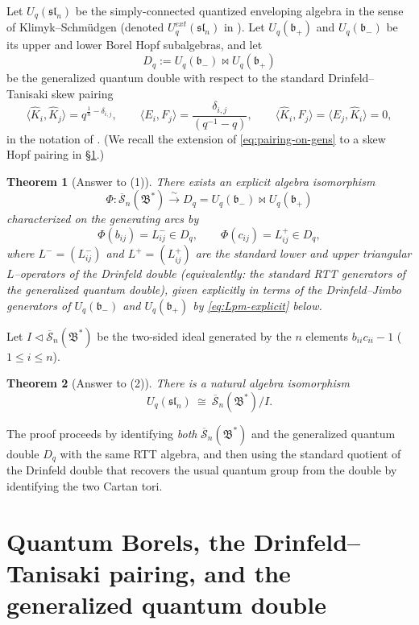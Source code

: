 \documentclass[11pt]{article}
\newcommand{\Uc}{U}
\newcommand{\sl}{\mathfrak{sl}}
\newcommand{\fb}{\mathfrak{b}}
\newcommand{\fB}{\mathfrak{B}}
\newcommand{\bcS}{\overline{\mathcal S}}
\newcommand{\la}{\langle}
\newcommand{\ra}{\rangle}
\newcommand{\bipr}{\bowtie}
\theoremstyle{plain}
\newtheorem{theorem}{Theorem}[section]
\theoremstyle{definition}
\begin{document}
Let $\Uc_q(\sl_n)$ be the simply-connected quantized enveloping algebra in the sense of Klimyk--Schm\"udgen (denoted $U_q^{ext}(\sl_n)$ in \cite[Ch.~8]{KS}).
Let $\Uc_q(\fb_+)$ and $\Uc_q(\fb_-)$ be its upper and lower Borel Hopf subalgebras, and let
\[
D_q := \Uc_q(\fb_-)\bipr \Uc_q(\fb_+)
\]
be the generalized quantum double with respect to the standard Drinfeld--Tanisaki skew pairing
\begin{equation}\label{eq:pairing-on-gens}
\la \hat K_i, \hat K_j\ra =q^{\frac1n-\delta_{i,j}},\qquad
\la E_i,F_j\ra=\frac{\delta_{i,j}}{(q^{-1}-q)}, \qquad
\la \hat K_i,F_j\ra=\la E_j,\hat K_i\ra=0,
\end{equation}
in the notation of \cite{KS}. (We recall the extension of \eqref{eq:pairing-on-gens} to a skew Hopf pairing in \S\ref{sec:pairing-double}.)

\begin{theorem}[Answer to (1)]\label{thm:main1}
There exists an explicit algebra isomorphism
\[
\Phi:\bcS_n(\fB^*)\xrightarrow{\ \sim\ } D_q=\Uc_q(\fb_-)\bipr \Uc_q(\fb_+)
\]
characterized on the generating arcs by
\[
\Phi(b_{ij})=L^-_{ij}\in D_q,\qquad \Phi(c_{ij})=L^+_{ij}\in D_q,
\]
where $L^-=(L^-_{ij})$ and $L^+=(L^+_{ij})$ are the standard lower and upper triangular $L$--operators of the Drinfeld double (equivalently: the standard RTT generators of the generalized quantum double), given explicitly in terms of the Drinfeld--Jimbo generators of $\Uc_q(\fb_-)$ and $\Uc_q(\fb_+)$ by \eqref{eq:Lpm-explicit} below.
\end{theorem}

Let $I\lhd \bcS_n(\fB^*)$ be the two-sided ideal generated by the $n$ elements $b_{ii}c_{ii}-1$ ($1\le i\le n$).

\begin{theorem}[Answer to (2)]\label{thm:main2}
There is a natural algebra isomorphism
\[
\Uc_q(\sl_n)\ \cong\ \bcS_n(\fB^*)/I.
\]
\end{theorem}

The proof proceeds by identifying \emph{both} $\bcS_n(\fB^*)$ and the generalized quantum double $D_q$ with the same RTT algebra, and then using the standard quotient of the Drinfeld double that recovers the usual quantum group from the double by identifying the two Cartan tori.

\section{Quantum Borels, the Drinfeld--Tanisaki pairing, and the generalized quantum double}
\label{sec:pairing-double}
\end{document}
